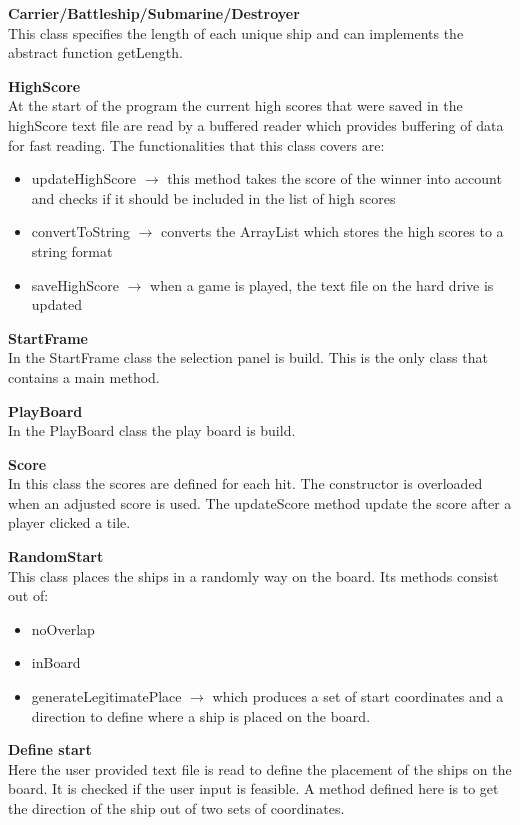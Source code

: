 \documentclass[a4paper,10pt]{article}
\begin{document}
\textbf{Carrier/Battleship/Submarine/Destroyer}\\
This class specifies the length of each unique ship and can implements the abstract function getLength.

\textbf{HighScore}\\
At the start of the program the current high scores that were saved in the highScore text file are read by a buffered reader which provides buffering of data for fast reading. The functionalities that this class covers are:

\begin{itemize}
	\item updateHighScore $ \rightarrow $ this method takes the score of the winner into account and checks if it should be included in the list of high scores
	\item convertToString $ \rightarrow $ converts the ArrayList which stores the high scores to a string format
	\item saveHighScore $ \rightarrow $ when a game is played, the text file on the hard drive is updated
\end{itemize}

\textbf{StartFrame}\\
In the StartFrame class the selection panel is build. This is the only class that contains a main method.

\textbf{PlayBoard}\\
In the PlayBoard class the play board is build.

\textbf{Score}\\
In this class the scores are defined for each hit. The constructor is overloaded when an adjusted score is used. 
The updateScore method update the score after a player clicked a tile.

\textbf{RandomStart}\\
This class places the ships in a randomly way on the board. Its methods consist out of:

\begin{itemize}
	\item noOverlap
	\item inBoard
	\item generateLegitimatePlace $ \rightarrow $ which produces a set of start coordinates and a direction to define where a ship is placed on the board.
\end{itemize}

\textbf{Define start}\\
Here the user provided text file is read to define the placement of the ships on the board. It is checked if the user input is feasible. A method defined here is to get the direction of the ship out of two sets of coordinates. 
\end{document}
